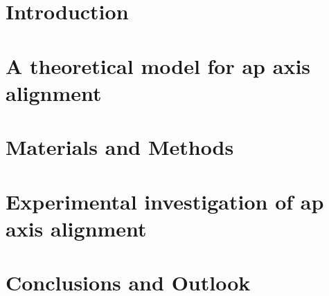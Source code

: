 \documentclass[
    BCOR=6mm,
    DIV=13,
    draft=false,
    titlepage=true,
    twoside=false,
    toc=bib,
    parskip=half-,
    chapterprefix=true,
    appendixprefix=true,
    footnotes=multiple,
    headsepline=true]{scrreprt}
\begin{document}
\tableofcontents
\listoffigures

\cleardoubleoddpage
{}

\chapter{Introduction}\label{ch:APAxisIntro}


\chapter{A theoretical model for \acs{ap} axis alignment}\label{ch:ActiveMatter}


\chapter{Materials and Methods}\label{ch:Exp}


\chapter{Experimental investigation of \acs{ap} axis alignment}\label{ch:Results}


\chapter{Conclusions and Outlook}\label{ch:Summary}




\printbibliography[title={Bibliography}]





\clearpage

\end{document}
